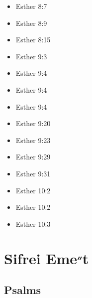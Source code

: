 \documentclass[14pt]{book}
\begin{document}
\begin{multicols}{2}
\begin{itemize}
							\item Esther 8:7
							
							\item Esther 8:9
							
							\item Esther 8:15
							
							\item Esther 9:3
							
							\item Esther 9:4
							
							\item Esther 9:4
							
							\item Esther 9:4
							
							\item Esther 9:20
							
							\item Esther 9:23
							
							\item Esther 9:29
							
							\item Esther 9:31
							
							\item Esther 10:2
							
							\item Esther 10:2
							
							\item Esther 10:3
							
						\end{itemize}\end{multicols}
					
\section{Sifrei Eme״t}

\subsection{Psalms}
\end{document}
